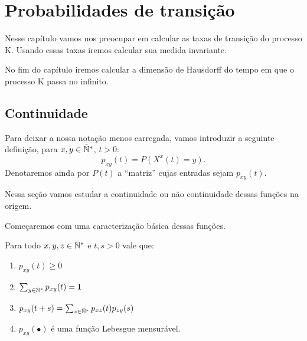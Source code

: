 \chapter{Probabilidades de transição}
\label{cap:taxas}

Nesse capítulo vamos nos preocupar em calcular as taxas de transição
do processo K. Usando essas taxas iremos calcular sua medida invariante.

No fim do capítulo iremos calcular a dimensão de Hausdorff do tempo em
que o processo K passa no infinito.



\section{Continuidade}
\label{sec:continuidade}

Para deixar a nossa notação menos carregada, vamos introduzir a
seguinte definição, para $x, y \in {\mathbb{\bar{N}^*}}$, $t > 0$:
\begin{equation}
  p_{xy} (t) = P(X^x(t) = y).
\end{equation}
Denotaremos ainda por $P(t)$ a ``matriz'' cujas entradas sejam $p_{xy}(t)$.

Nessa seção vamos estudar a continuidade ou não continuidade dessas
funções na origem.

Começaremos com uma caracterização básica dessas funções.
\begin{proposicao}
  \label{prop:transicao-mensuravel}
  Para todo $x, y, z \in {\mathbb{\bar{N}^*}}$ e $t, s > 0$ vale que:
  \begin{enumerate}
  \item $p_{xy}(t) \geq 0$
  \item $\sum_{y \in {\mathbb{\bar{N}^*}}} p_{xy}(t) = 1$
  \item $p_{xy}(t+s) = \sum_{z\in{\mathbb{\bar{N}^*}}}p_{xz}(t)p_{zy}(s)$
  \item $p_{xy}(\bullet)$ é uma função Lebesgue mensurável.
  \end{enumerate}
\end{proposicao}

